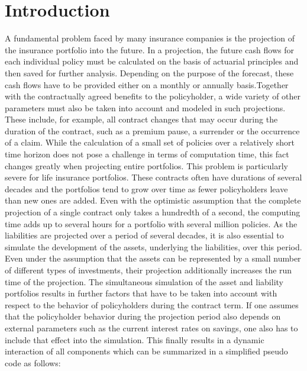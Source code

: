

\chapter{Introduction}
\label{cha:introduction}

A fundamental problem faced by many insurance companies is the projection of the insurance portfolio into the future. In a projection, the future cash flows for each individual policy must be calculated on the basis of actuarial principles and then saved for further analysis. Depending on the purpose of the forecast, these cash flows have to be provided either on a monthly or annually basis.Together with the contractually agreed benefits to the policyholder, a wide variety of other parameters must also be taken into account and modeled in such projections. These include, for example, all contract changes that may occur during the duration of the contract, such as a premium pause, a surrender or the occurrence of a claim. While the calculation of a small set of policies over a relatively short time horizon does not pose a challenge in terms of computation time, this fact changes greatly when projecting entire portfolios. This problem is particularly severe for life insurance portfolios. These contracts often have durations of several decades and the portfolios tend to grow over time as fewer policyholders leave than new ones are added. Even with the optimistic assumption that the complete projection of a single contract only takes a hundredth of a second, the computing time adds up to several hours for a portfolio with several million policies. As the liabilities are projected over a period of several decades, it is also essential to simulate the development of the assets, underlying the liabilities, over this period. Even under the assumption that the assets can be represented by a small number of different types of investments, their projection additionally increases the run time of the projection. The simultaneous simulation of the asset and liability portfolios results in further factors that have to be taken into account with respect to the behavior of policyholders during the contract term. If one assumes that the policyholder behavior during the projection period also depends on external parameters such as the current interest rates on savings, one also has to include that effect into the simulation. This finally results in a dynamic interaction of all components which can be summarized in a simplified pseudo code as follows:

